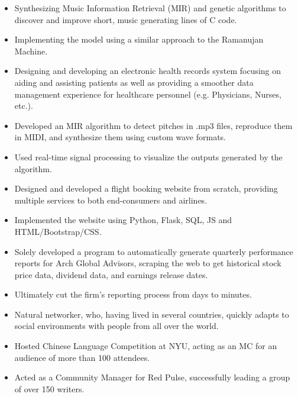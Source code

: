 \documentclass[10pt,a4paper,ragged2e]{altacv}
\begin{document}
\begin{multicols}{2}
	\begin{itemize}
		\item Synthesizing Music Information Retrieval (MIR) and genetic algorithms to discover and improve short, music generating lines of C code.
		\item Implementing the model using a similar approach to the Ramanujan Machine.
	\end{itemize}
	\smallskip
	\begin{itemize}
		\item Designing and developing an electronic health records system focusing on aiding and assisting patients as well as providing a smoother data management experience for healthcare personnel (e.g. Physicians, Nurses, etc.).
	\end{itemize}
	\smallskip
	\begin{itemize}
		\item Developed an MIR algorithm to detect pitches in .mp3 files, reproduce them in MIDI, and synthesize them using custom wave formats.
		\item Used real-time signal processing to visualize the outputs generated by the algorithm.
	\end{itemize}
	\smallskip
	\begin{itemize}
		\item Designed and developed a flight booking website from scratch, providing multiple services to both end-consumers and airlines.
		\item Implemented the website using Python, Flask, SQL, JS and HTML/Bootstrap/CSS.
	\end{itemize}
	\smallskip
	\begin{itemize}
		\item Solely developed a program to automatically generate quarterly performance reports for Arch Global Advisors, scraping the web to get historical stock price data, dividend data, and earnings release dates.
		\item Ultimately cut the firm's reporting process from days to minutes.
	\end{itemize}

	\begin{itemize}
		\item Natural networker, who, having lived in several countries, quickly adapts to social environments with people from all over the world.
		\item Hosted Chinese Language Competition at NYU, acting as an MC for an audience of more than 100 attendees.
		\item Acted as a Community Manager for Red Pulse, successfully leading a group of over 150 writers.

	\end{itemize}

	\cvproject{}


\end{multicols}
\clearpage
\end{document}
